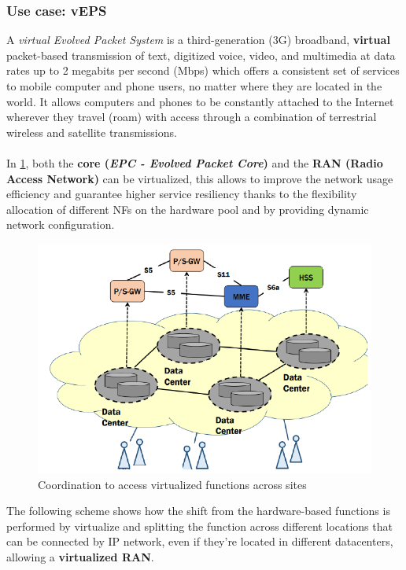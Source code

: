 \documentclass[10pt,a4paper]{report}
\theoremstyle{definition}
\begin{document}
\subsubsection{Use case: vEPS}\label{sec:use-case-veps}
A \textit{virtual Evolved Packet System} is a third-generation (3G) broadband, \textbf{virtual} packet-based transmission of text, digitized voice, video, and multimedia at data rates up to 2 megabits per second (Mbps) which offers a consistent set of services to mobile computer and phone users, no matter where they are located in the world. It allows computers and phones to be constantly attached to the Internet wherever they travel (roam) with access through a combination of terrestrial wireless and satellite transmissions.\\\\
In \ref{veps-schema}, both the \textbf{core (\textit{EPC - Evolved Packet Core})} and the \textbf{RAN (Radio Access Network)} can be virtualized, this allows to improve the network usage efficiency and guarantee higher service resiliency thanks to the flexibility allocation of different NFs on the hardware pool and by providing dynamic network configuration.
\begin{figure}
	\centering\includegraphics[scale=0.50]{images/Pasted image 20230405165048.png}
	\caption{Coordination to access virtualized functions across sites}
	\label{veps-schema}
\end{figure}
The following scheme shows how the shift from the hardware-based functions is performed by virtualize and splitting the function across different locations that can be connected by IP network, even if they're located in different datacenters, allowing a \textbf{virtualized RAN}.\\
\end{document}
